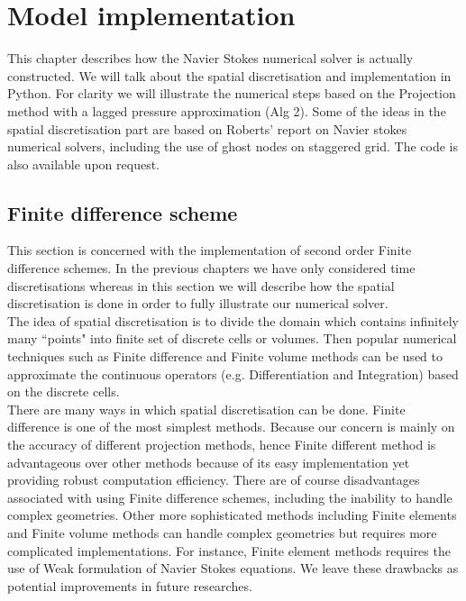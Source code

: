 \chapter{Model implementation}
\label{chapter 5}
This chapter describes how the Navier Stokes numerical solver is actually constructed. We will talk about the spatial discretisation and implementation in Python. For clarity we will illustrate the numerical steps based on the Projection method with a lagged pressure approximation (Alg 2). Some of the ideas in the spatial discretisation part are based on Roberts' report on Navier stokes numerical solvers, including the use of ghost nodes on staggered grid. The code is also available upon request.

\section{Finite difference scheme}
This section is concerned with the implementation of second order Finite difference schemes. In the previous chapters we have only considered time discretisations whereas in this section we will describe how the spatial discretisation is done in order to fully illustrate our numerical solver.\\

The idea of spatial discretisation is to divide the domain which contains infinitely many ``points" into finite set of discrete cells or volumes. Then popular numerical techniques such as Finite difference and Finite volume methods can be used to approximate the continuous operators (e.g. Differentiation and Integration) based on the discrete cells.\\

There are many ways in which spatial discretisation can be done. Finite difference is one of the most simplest methods. Because our concern is mainly on the accuracy of different projection methods, hence Finite different method is advantageous over other methods because of its easy implementation yet providing robust computation efficiency. There are of course disadvantages associated with using Finite difference schemes, including the inability to handle complex geometries. Other more sophisticated methods including Finite elements and Finite volume methods can handle complex geometries but requires more complicated implementations. For instance, Finite element methods requires the use of Weak formulation of Navier Stokes equations. We leave these drawbacks as potential improvements in future researches.\\

